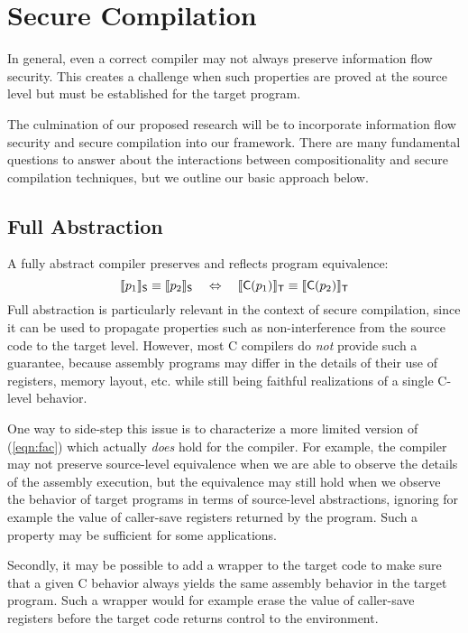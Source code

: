\section{Secure Compilation}
\label{sec:security}

In general,
even a correct compiler may not always preserve
information flow security.
This creates a challenge when such properties
are proved at the source level
but must be established for the target program.

The culmination of our proposed research will be to incorporate
information flow security and secure compilation
into our framework.
There are many fundamental questions to answer
about the interactions between compositionality
and secure compilation techniques,
but we outline our basic approach below.

\subsection{Full Abstraction}
\label{ssec:fullabs}

A fully abstract compiler preserves and reflects program equivalence:
\begin{equation} \label{eqn:fac}
  \llbracket p_1 \rrbracket_{ \mathsf{S} } \equiv
  \llbracket p_2 \rrbracket_{ \mathsf{S} }
  \quad \Leftrightarrow \quad
  \llbracket  \mathsf{C} (p_1) \rrbracket_{ \mathsf{T} } \equiv
  \llbracket  \mathsf{C} (p_2) \rrbracket_{ \mathsf{T} }
\end{equation}
Full abstraction is particularly relevant
in the context of secure compilation,
since it can be used to propagate properties such as non-interference
from the source code to the target level.
However,
most C compilers do \emph{not} provide such a guarantee,
because assembly programs may differ in the details
of their use of registers, memory layout, etc.
while still being faithful realizations of a single C-level behavior.

One way to side-step this issue
is to characterize a more limited version of (\ref{eqn:fac})
which actually \emph{does} hold for the compiler.
For example,
the compiler may not preserve source-level equivalence
when we are able to observe the details of the assembly execution,
but the equivalence may still hold when
we observe the behavior of target programs
in terms of source-level abstractions,
ignoring for example the value of caller-save registers
returned by the program.
Such a property may be sufficient for some applications.

Secondly,
it may be possible to add a wrapper to the target code
to make sure that a given C behavior always yields
the same assembly behavior in the target program.
Such a wrapper would for example
erase the value of caller-save registers
before the target code returns control to the environment.

